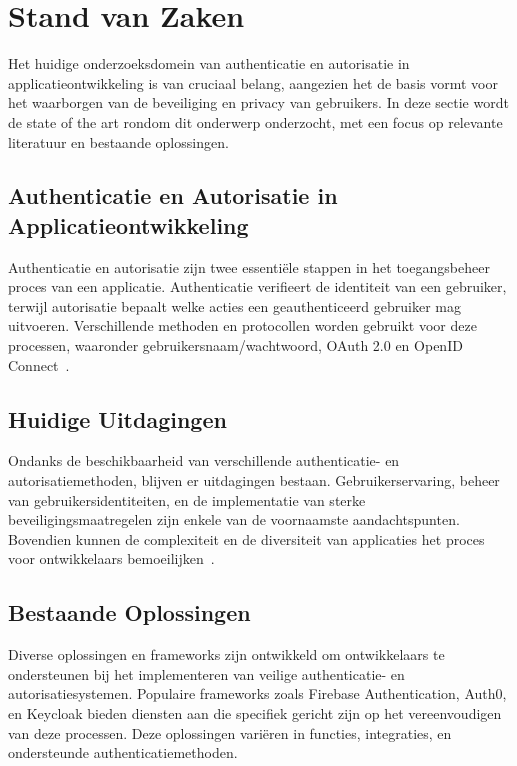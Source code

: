 
\section{Stand van Zaken}%
\label{sec:state-of-the-art}

Het huidige onderzoeksdomein van authenticatie en autorisatie in applicatieontwikkeling is van cruciaal belang, aangezien het de basis vormt voor het
waarborgen van de beveiliging en privacy van gebruikers. In deze sectie wordt de state of the art rondom dit onderwerp onderzocht, met een focus op
relevante literatuur en bestaande oplossingen.

\subsection{Authenticatie en Autorisatie in Applicatieontwikkeling}

Authenticatie en autorisatie zijn twee essentiële stappen in het toegangsbeheer proces van een applicatie. Authenticatie verifieert de identiteit van
een gebruiker, terwijl autorisatie bepaalt welke acties een geauthenticeerd gebruiker mag uitvoeren. Verschillende methoden en protocollen worden
gebruikt voor deze processen, waaronder gebruikersnaam/wachtwoord, OAuth 2.0 en OpenID Connect~\autocite{Hardt2012}.

\subsection{Huidige Uitdagingen}

Ondanks de beschikbaarheid van verschillende authenticatie- en autorisatiemethoden, blijven er uitdagingen bestaan. Gebruikerservaring, beheer van
gebruikersidentiteiten, en de implementatie van sterke beveiligingsmaatregelen zijn enkele van de voornaamste aandachtspunten. Bovendien kunnen de
complexiteit en de diversiteit van applicaties het proces voor ontwikkelaars bemoeilijken~\autocite{Bakar2013}.

\subsection{Bestaande Oplossingen}

Diverse oplossingen en frameworks zijn ontwikkeld om ontwikkelaars te ondersteunen bij het implementeren van veilige authenticatie- en autorisatiesystemen.
Populaire frameworks zoals Firebase Authentication, Auth0, en Keycloak bieden diensten aan die specifiek gericht zijn op het vereenvoudigen van deze
processen. Deze oplossingen variëren in functies, integraties, en ondersteunde authenticatiemethoden.

